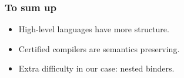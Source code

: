 \documentclass[9pt]{beamer}
\begin{document}



\begin{frame}
  \frametitle{To sum up}
  
  \begin{itemize}
  \item  High-level languages have more structure. 
  \item Certified compilers are semantics preserving.
  \item Extra difficulty in our case: nested binders.
  \end{itemize}
  
\end{frame}



\end{document}
